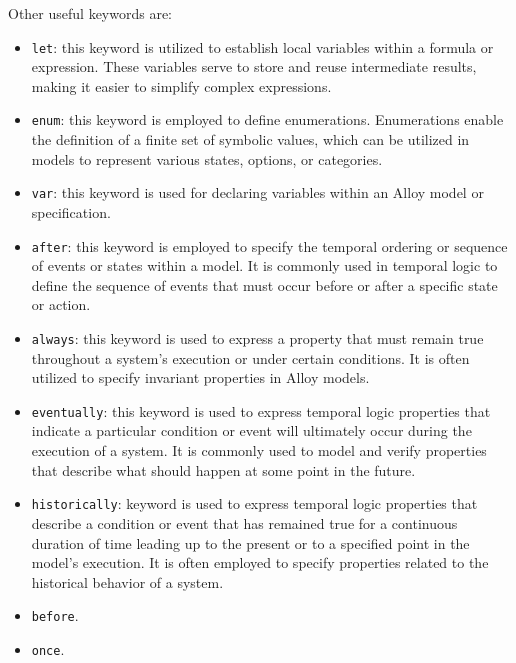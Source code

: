 Other useful keywords are: 
\begin{itemize}
    \item \texttt{let}: this keyword is utilized to establish local variables within a formula or expression. 
        These variables serve to store and reuse intermediate results, making it easier to simplify complex expressions.
    \item \texttt{enum}: this keyword is employed to define enumerations. 
        Enumerations enable the definition of a finite set of symbolic values, which can be utilized in models to represent various states, options, or categories.
    \item \texttt{var}: this keyword is used for declaring variables within an Alloy model or specification.
    \item \texttt{after}: this keyword is employed to specify the temporal ordering or sequence of events or states within a model. 
        It is commonly used in temporal logic to define the sequence of events that must occur before or after a specific state or action.
    \item \texttt{always}: this keyword is used to express a property that must remain true throughout a system's execution or under certain conditions.
        It is often utilized to specify invariant properties in Alloy models.
    \item \texttt{eventually}: this keyword is used to express temporal logic properties that indicate a particular condition or event will ultimately occur during the execution of a system. 
        It is commonly used to model and verify properties that describe what should happen at some point in the future.
    \item \texttt{historically}: keyword is used to express temporal logic properties that describe a condition or event that has remained true for a continuous duration of time leading up to the present or to a specified point in the model's execution.
        It is often employed to specify properties related to the historical behavior of a system.
    \item \texttt{before}. 
    \item \texttt{once}. 
\end{itemize}